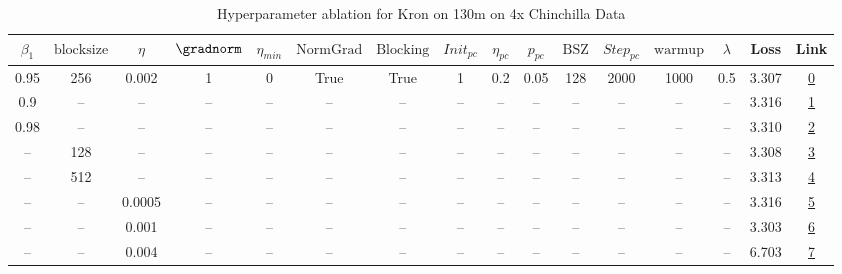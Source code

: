 \begin{table}[H]
\centering
\caption{Hyperparameter ablation for Kron on 130m on 4x Chinchilla Data}
\label{tab:ablation_kron_130m_on_4x_chinchilla_data}
\begin{tabular}{cccccccccccccccc}
\toprule
$\beta_1$ & $\mathrm{block size}$ & $\eta$ & $\gradnorm$ & $\eta_{min}$ & $\mathrm{NormGrad}$ & $\mathrm{Blocking}$ & $Init_{pc}$ & $\eta_{pc}$ & $p_{pc}$ & $\mathrm{BSZ}$ & $Step_{pc}$ & $\mathrm{warmup}$ & $\lambda$ & Loss & Link \\
\midrule
0.95 & 256 & 0.002 & 1 & 0 & True & True & 1 & 0.2 & 0.05 & 128 & 2000 & 1000 & 0.5 & 3.307 & \href{https://wandb.ai/stanford-mercury/optimizer-scaling/runs/sweep-130m-10B-kronm1a1c3blr0.002-wd0.5-b10.95-plr0.2-pis1-gn1-n-b8692a}{0} \\
\midrule
0.9 & -- & -- & -- & -- & -- & -- & -- & -- & -- & -- & -- & -- & -- & 3.316 & \href{https://wandb.ai/stanford-mercury/optimizer-scaling/runs/sweep-130m-10B-kronc8cdf3lr0.002-wd0.5-b10.9-plr0.2-pis1-gn1-nor-e40586}{1} \\
0.98 & -- & -- & -- & -- & -- & -- & -- & -- & -- & -- & -- & -- & -- & 3.310 & \href{https://wandb.ai/stanford-mercury/optimizer-scaling/runs/sweep-130m-10B-kron05da28lr0.002-wd0.5-b10.98-plr0.2-pis1-gn1-no-be2fbc}{2} \\
-- & 128 & -- & -- & -- & -- & -- & -- & -- & -- & -- & -- & -- & -- & 3.308 & \href{https://wandb.ai/stanford-mercury/optimizer-scaling/runs/sweep-130m-10B-kron494d83lr0.002-wd0.5-b10.95-plr0.2-pis1-gn1-no-134f26}{3} \\
-- & 512 & -- & -- & -- & -- & -- & -- & -- & -- & -- & -- & -- & -- & 3.313 & \href{https://wandb.ai/stanford-mercury/optimizer-scaling/runs/sweep-130m-10B-krond4b6e6lr0.002-wd0.5-b10.95-plr0.2-pis1-gn1-no-439652}{4} \\
-- & -- & 0.0005 & -- & -- & -- & -- & -- & -- & -- & -- & -- & -- & -- & 3.316 & \href{https://wandb.ai/stanford-mercury/optimizer-scaling/runs/sweep-130m-10B-kron53973dlr0.0005-wd0.5-b10.95-plr0.2-pis1-gn1-n-7bcfe7}{5} \\
-- & -- & 0.001 & -- & -- & -- & -- & -- & -- & -- & -- & -- & -- & -- & 3.303 & \href{https://wandb.ai/stanford-mercury/optimizer-scaling/runs/sweep-130m-10B-kron2f3c38lr0.001-wd0.5-b10.95-plr0.2-pis1-gn1-no-a0a910}{6} \\
-- & -- & 0.004 & -- & -- & -- & -- & -- & -- & -- & -- & -- & -- & -- & 6.703 & \href{https://wandb.ai/stanford-mercury/optimizer-scaling/runs/sweep-130m-10B-kron053fe8lr0.004-wd0.5-b10.95-plr0.2-pis1-gn1-no-611f99}{7} \\

\end{tabular}
\end{table}
